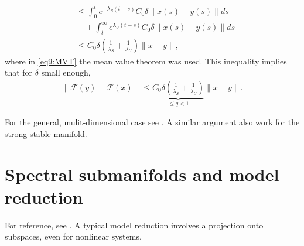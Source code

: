 \begin{enumerate}
\begin{align}
					    &\leq \int_{0}^{t} e^{-\lambda _{S}(t-s)}C_0 \delta \| x(s) - y(s)\| ds \\
					    &\quad + \int_{t}^{\infty } e^{\lambda _{U}(t-s)}C_0 \delta \|x(s) - y(s)\| ds \label{eq9:MVT}\\
					    &\leq C_0 \delta \left(\frac{1}{\lambda _{S}} + \frac{1}{\lambda _{U}} \right) \| x - y\|,
\end{align}
where in \eqref{eq9:MVT} the mean value theorem was used. This inequality implies that for $\delta$ small enough,
\begin{align}
	\|\mathcal{F}(y) - \mathcal{F}(x) \| \leq \underbrace{C_0 \delta \left( \frac{1}{\lambda_S} + \frac{1}{\lambda _{U}}\right) }_{\leq q < 1} \| x - y\|.
\end{align}
\end{enumerate}
For the general, mulit-dimensional case see \cite{Chicone}. A similar argument also work for the strong stable manifold.

\section{Spectral submanifolds and model reduction}
For reference, see \cite{Ponsioen2016}. A typical model reduction involves a projection onto subspaces, even for nonlinear systems.

